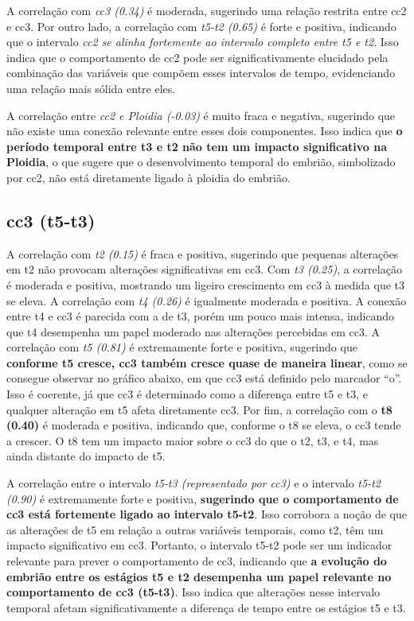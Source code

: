 A correlação com \textit{cc3 (0.34)} é moderada, sugerindo uma relação restrita entre cc2 e cc3. Por outro lado, a correlação com \textit{t5-t2 (0.65)} é forte e positiva, indicando que o intervalo \textit{cc2 se alinha fortemente ao intervalo completo entre t5 e t2}. Isso indica que o comportamento de cc2 pode ser significativamente elucidado pela combinação das variáveis que compõem esses intervalos de tempo, evidenciando uma relação mais sólida entre eles.

A correlação entre \textit{cc2 e Ploidia (-0.03)} é muito fraca e negativa, sugerindo que não existe uma conexão relevante entre esses dois componentes. Isso indica que \textbf{o período temporal entre t3 e t2 não tem um impacto significativo na Ploidia}, o que sugere que o desenvolvimento temporal do embrião, simbolizado por cc2, não está diretamente ligado à ploidia do embrião.

\subsection*{cc3 (t5-t3)}
A correlação com \textit{t2 (0.15)} é fraca e positiva, sugerindo que pequenas alterações em t2 não provocam alterações significativas em cc3. Com \textit{t3 (0.25)}, a correlação é moderada e positiva, mostrando um ligeiro crescimento em cc3 à medida que t3 se eleva. A correlação com \textit{t4 (0.26)} é igualmente moderada e positiva. A conexão entre t4 e cc3 é parecida com a de t3, porém um pouco mais intensa, indicando que t4 desempenha um papel moderado nas alterações percebidas em cc3. A correlação com \textit{t5 (0.81)} é extremamente forte e positiva, sugerindo que \textbf{conforme t5 cresce, cc3 também cresce quase de maneira linear}, como se consegue observar no gráfico abaixo, em que cc3 está definido pelo marcador “o”. Isso é coerente, já que cc3 é determinado como a diferença entre t5 e t3, e qualquer alteração em t5 afeta diretamente cc3. Por fim, a correlação com o \textbf{t8 (0.40)} é moderada e positiva, indicando que, conforme o t8 se eleva, o cc3 tende a crescer. O t8 tem um impacto maior sobre o cc3 do que o t2, t3, e t4, mas ainda distante do impacto de t5.

A correlação entre o intervalo \textit{t5-t3 (representado por cc3)} e o intervalo \textit{t5-t2 (0.90)} é extremamente forte e positiva, \textbf{sugerindo que o comportamento de cc3 está fortemente ligado ao intervalo t5-t2}. Isso corrobora a noção de que as alterações de t5 em relação a outras variáveis temporais, como t2, têm um impacto significativo em cc3. Portanto, o intervalo t5-t2 pode ser um indicador relevante para prever o comportamento de cc3, indicando que \textbf{a evolução do embrião entre os estágios t5 e t2 desempenha um papel relevante no comportamento de cc3 (t5-t3)}. Isso indica que alterações nesse intervalo temporal afetam significativamente a diferença de tempo entre os estágios t5 e t3. 

